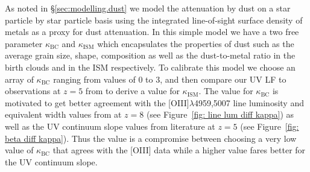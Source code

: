 As noted in \S\ref{sec:modelling.dust} we model the attenuation by dust on a star particle by star particle basis using the integrated line-of-sight surface density of metals as a proxy for dust attenuation. In this simple model we have a two free parameter $\kappa_{\textrm{BC}}$ and $\kappa_{\textrm{ISM}}$ which encapsulates the properties of dust such as the average grain size, shape, composition as well as the dust-to-metal ratio in the birth clouds and in the ISM respectively. To calibrate this model we choose an array of $\kappa_{\textrm{BC}}$ ranging from values of 0 to 3, and then compare our UV LF to observations at $z=5$ from \cite{Bouwens_2015a} to derive a value for $\kappa_{\textrm{ISM}}$. The value for $\kappa_{\textrm{BC}}$ is motivated to get better agreement with the [OIII]$\lambda$4959,5007 line luminosity and equivalent width values from \cite{deBarros19_OIIIHbeta} at $z=8$ (see Figure~\ref{fig: line lum diff kappa}) as well as the UV continuum slope values from literature at $z=5$ (see Figure~\ref{fig: beta diff kappa}). Thus the value is a compromise between choosing a very low value of $\kappa_{\textrm{BC}}$ that agrees with the [OIII] data while a higher value fares better for the UV continuum slope.

